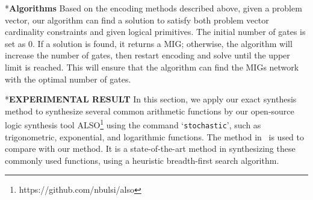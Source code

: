 \documentclass[conference,letterpaper]{IEEEtran}
\makeatletter
\renewcommand{\section}{\@startsection{section}{1}{0mm}
    {-\baselineskip}{0.001\baselineskip}{\bf\leftline}}
\renewcommand{\subsection}{\@startsection{subsection}{1}{0mm}
	{-\baselineskip}{0.001\baselineskip}{\bf\leftline}}
\makeatother
\begin{document}
%
\subsection*{\textbf{Algorithms }}
Based on the encoding methods described above, given a problem vector, our algorithm can find a solution to satisfy both problem vector cardinality constraints and given logical primitives. The initial number of gates is set as 0. If a solution is found, it returns a MIG; otherwise, the algorithm will increase the number of gates, then restart encoding and solve until the upper limit is reached. This will ensure that the algorithm can find the MIGs network with the optimal number of gates.

\section*{\textbf{\large EXPERIMENTAL RESULT}}
In this section, we apply our exact synthesis method to synthesize several common arithmetic functions by our open-source logic synthesis tool ALSO\footnote{https://github.com/nbulsi/also} using the command `\texttt{stochastic}', such as trigonometric, exponential, and logarithmic functions. The method in~\cite{2} is used to compare with our method. It is a state-of-the-art method in synthesizing these commonly used functions, using a heuristic breadth-first search algorithm. 
\end{document}
